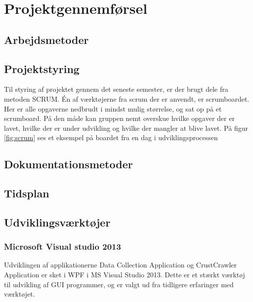 \thispagestyle{fancy}
\chapter{Projektgennemførsel}
\label{chp:projektgennemforsel}

\section{Arbejdsmetoder}
\label{sec:arbejdsmetoder}

\section{Projektstyring}
\label{sec:projektstyring}

Til styring af projektet gennem det seneste semester, er der brugt dele fra metoden SCRUM.
Én af værktøjerne fra scrum der er anvendt, er scrumboardet. Her er alle opgaverne nedbrudt i mindst mulig størrelse, og sat op på et scrumboard. På den måde kan gruppen nemt overskue hvilke opgaver der er lavet, hvilke der er under udvikling og hvilke der mangler at blive lavet. På figur \ref{fig:scrum} ses et eksempel på boardet fra en dag i udviklingsprocessen



\section{Dokumentationsmetoder}
\label{sec:dokumentationsmetoder}

\section{Tidsplan}
\label{sec:tidsplan}

\section{Udviklingsværktøjer}
\label{sec:Udviklingsvaerktojer}

\subsection{Microsoft Visual studio 2013}
Udviklingen af applikationerne Data Collection Application og CrustCrawler Application er sket i WPF i MS Visual Studio 2013. Dette er et stærkt værktøj til udvikling af GUI programmer, og er valgt ud fra tidligere erfaringer med værktøjet.

